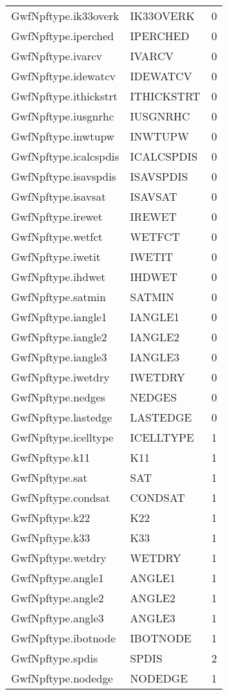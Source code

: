 \begin{longtable}{p{6cm} p{4cm} p{2cm} }
GwfNpftype.ik33overk &  IK33OVERK & 0 \\ 
GwfNpftype.iperched &  IPERCHED & 0 \\ 
GwfNpftype.ivarcv &  IVARCV & 0 \\ 
GwfNpftype.idewatcv &  IDEWATCV & 0 \\ 
GwfNpftype.ithickstrt &  ITHICKSTRT & 0 \\ 
GwfNpftype.iusgnrhc &  IUSGNRHC & 0 \\ 
GwfNpftype.inwtupw &  INWTUPW & 0 \\ 
GwfNpftype.icalcspdis &  ICALCSPDIS & 0 \\ 
GwfNpftype.isavspdis &  ISAVSPDIS & 0 \\ 
GwfNpftype.isavsat &  ISAVSAT & 0 \\ 
GwfNpftype.irewet &  IREWET & 0 \\ 
GwfNpftype.wetfct &  WETFCT & 0 \\ 
GwfNpftype.iwetit &  IWETIT & 0 \\ 
GwfNpftype.ihdwet &  IHDWET & 0 \\ 
GwfNpftype.satmin &  SATMIN & 0 \\ 
GwfNpftype.iangle1 &  IANGLE1 & 0 \\ 
GwfNpftype.iangle2 &  IANGLE2 & 0 \\ 
GwfNpftype.iangle3 &  IANGLE3 & 0 \\ 
GwfNpftype.iwetdry &  IWETDRY & 0 \\ 
GwfNpftype.nedges &  NEDGES & 0 \\ 
GwfNpftype.lastedge &  LASTEDGE & 0 \\ 
GwfNpftype.icelltype &  ICELLTYPE & 1 \\ 
GwfNpftype.k11 &  K11 & 1 \\ 
GwfNpftype.sat &  SAT & 1 \\ 
GwfNpftype.condsat &  CONDSAT & 1 \\ 
GwfNpftype.k22 &  K22 & 1 \\ 
GwfNpftype.k33 &  K33 & 1 \\ 
GwfNpftype.wetdry &  WETDRY & 1 \\ 
GwfNpftype.angle1 &  ANGLE1 & 1 \\ 
GwfNpftype.angle2 &  ANGLE2 & 1 \\ 
GwfNpftype.angle3 &  ANGLE3 & 1 \\ 
GwfNpftype.ibotnode &  IBOTNODE & 1 \\ 
GwfNpftype.spdis &  SPDIS & 2 \\ 
GwfNpftype.nodedge &  NODEDGE & 1 \\ 

\end{longtable}
